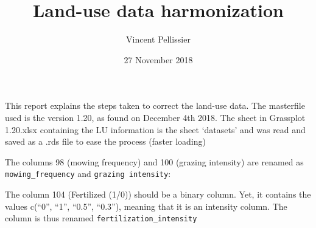 \documentclass[table]{article}
\title{Land-use data harmonization}
\author{Vincent Pellissier}
\date{27 November 2018}
\newenvironment{Shaded}{\begin{snugshade}}{\end{snugshade}}
\newcommand{\KeywordTok}[1]{\textcolor[rgb]{0.13,0.29,0.53}{\textbf{#1}}}
\newcommand{\DataTypeTok}[1]{\textcolor[rgb]{0.13,0.29,0.53}{#1}}
\newcommand{\DecValTok}[1]{\textcolor[rgb]{0.00,0.00,0.81}{#1}}
\newcommand{\StringTok}[1]{\textcolor[rgb]{0.31,0.60,0.02}{#1}}
\newcommand{\OtherTok}[1]{\textcolor[rgb]{0.56,0.35,0.01}{#1}}
\newcommand{\OperatorTok}[1]{\textcolor[rgb]{0.81,0.36,0.00}{\textbf{#1}}}
\newcommand{\NormalTok}[1]{#1}
\begin{document}
\maketitle

This report explains the steps taken to correct the land-use data. The
masterfile used is the version 1.20, as found on December 4th 2018. The
sheet in Grassplot 1.20.xlsx containing the LU information is the sheet
`datasets' and was read and saved as a .rds file to ease the process
(faster loading)

\begin{Shaded}
\end{Shaded}

The columns 98 (mowing frequency) and 100 (grazing intensity) are
renamed as \texttt{mowing\_frequency} and \texttt{grazing\ intensity}:

\begin{Shaded}
\end{Shaded}

The column 104 (Fertilized (1/0)) should be a binary column. Yet, it
contains the values c(``0'', ``1'', ``0.5'', ``0.3''), meaning that it
is an intensity column. The column is thus renamed
\texttt{fertilization\_intensity}
\end{document}
